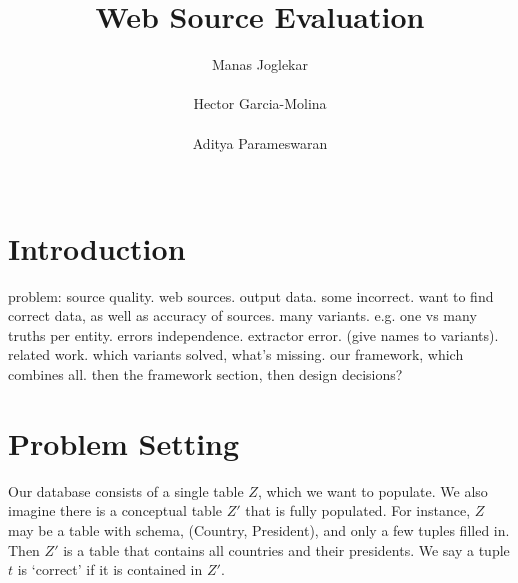 \documentclass{sig-alternate}
\newcounter{prob}
\begin{document}
\title{Web Source Evaluation}
\author{
\alignauthor
Manas Joglekar\\
       \\
\alignauthor
Hector Garcia-Molina\\
       \\
\alignauthor 
Aditya Parameswaran\\
       \\
}
\maketitle

\begin{abstract}
\end{abstract}


\section{Introduction}
problem: source quality. web sources. output data. some incorrect. want to find correct data, as well as accuracy of sources. many variants. e.g. one vs many truths per entity. errors independence. extractor error. (give names to variants). 
related work. which variants solved, what's missing. 
our framework, which combines all. then the framework section, then design decisions?

\section{Problem Setting}  
Our database consists of a single table $Z$, which we want to populate. We also imagine there is a conceptual table $Z'$ that is fully populated. For instance, $Z$ may be a table with schema, (Country, President), and only a few tuples filled in. Then $Z'$ is a table that contains all countries and their presidents. We say a tuple $t$ is `correct' if it is contained in $Z'$. 
\end{document}
